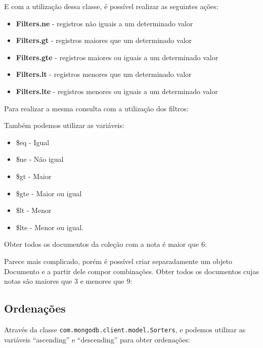 E com a utilização dessa classe, é possível realizar as seguintes ações:
\begin{itemize}[nolistsep]
	\item \textbf{Filters.ne} - registros não iguais a um determinado valor
	\item \textbf{Filters.gt} - registros maiores que um determinado valor
	\item \textbf{Filters.gte} - registros maiores ou iguais a um determinado valor
	\item \textbf{Filters.lt} - registros menores que um determinado valor
	\item \textbf{Filters.lte} - registros menores ou iguais a um determinado valor
\end{itemize}

Para realizar a mesma consulta com a utilização dos filtros: \\

Também podemos utilizar as variáveis: 
\begin{itemize}[nolistsep]
	\item \$eq - Igual
	\item \$ne - Não igual
	\item \$gt - Maior
	\item \$gte - Maior ou igual
	\item \$lt - Menor
	\item \$lte - Menor ou igual. 
\end{itemize}

Obter todos os documentos da coleção com a nota é maior que 6: \\

Parece mais complicado, porém é possível criar separadamente um objeto Documento e a partir dele compor combinações. Obter todos os documentos cujas notas são maiores que 3 e menores que 9: \\

\subsection{Ordenações}
Através da classe \texttt{com.mongodb.client.model.Sorters}, e podemos utilizar as variáveis ``ascending'' e ``descending'' para obter ordenações: \\

